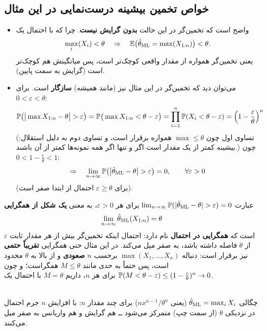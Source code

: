 \subsection{خواص تخمین بیشینه درست‌نمایی در این مثال}
\begin{itemize}
\item واضح است که تخمین‌گر  در این حالت \textbf{بدون گرایش نیست}. چرا که با احتمال یک
\[
\max_i(X_i)<\theta\quad\Rightarrow\quad\mathbb{E}\big(\hat\theta_{\mathrm{ML}}=\max(X_{1:n})\big)<\theta .
\]
یعنی تخمین‌گر همواره از مقدار واقعی کوچک‌تر است، پس میانگینش هم کوچک‌تر است (گرایش به سمت پایین).
\item می‌توان دید که تخمین‌گر  در این مثال نیز (مانند همیشه) \textbf{سازگار} است. برای $0<\varepsilon<\theta$:
\[
\Prob\big(\big|\max X_{1:n}-\theta\big|>\varepsilon\big)=\Prob\big(\max X_{1:n}<\theta-\varepsilon\big)=\prod_{i=1}^n\Prob(X_i<\theta-\varepsilon)=\Big(1-\frac\varepsilon\theta\Big)^n
\]
(تساوی اول چون $\max\le\theta$ همواره برقرار است، و تساوی دوم به دلیل استقلال: بیشینه کمتر از یک مقدار است اگر و تنها اگر همه نمونه‌ها کمتر از آن باشند.) چون $0<1-\frac\varepsilon\theta<1$:
\[
\Rightarrow\quad\lim_{n\to\infty}\Prob\big(\big|\hat\theta_\ML-\theta\big|>\varepsilon\big)=0,\qquad\forall\varepsilon>0
\]
(برای $\varepsilon\ge\theta$ احتمال از ابتدا صفر است).
\end{itemize}

\begin{note}
\notetitle عبارت $\lim_{n\to\infty}\Prob(|\hat\theta_\ML-\theta|>\varepsilon)=0$ برای هر $\varepsilon>0$، به معنی \textbf{یک شکل از همگرایی}
\[
\lim_{n\to\infty}\hat\theta_{\mathrm{ML}}(X_{1:n})=\theta
\]
است که \textbf{همگرایی در احتمال}  نام دارد: احتمال اینکه تخمین‌گر بیش از هر مقدار ثابت $\varepsilon$ از $\theta$ فاصله داشته باشد، به صفر میل می‌کند. در این مثال حتی همگرایی \textbf{تقریباً حتمی} نیز برقرار است: دنباله $\max(X_1,\ldots,X_n)$ برحسب $n$ \textbf{صعودی} و از بالا به $\theta$ محدود است، پس حتماً به حدی مانند $M\le\theta$ همگراست؛ و چون $\mathbb{P}(M<\theta-\varepsilon)\le(1-\frac\varepsilon\theta)^n\to0$ برای هر $n$، داریم $M=\theta$ با احتمال یک.
\end{note}

\begin{center}
\\
{\small چگالی $\hat\theta_{\mathrm{ML}}=\max_iX_i$ (یعنی $nx^{n-1}/\theta^n$) برای چند مقدار $n$: با افزایش $n$ جرم احتمال در نزدیکی $\theta$ (از سمت چپ) متمرکز می‌شود ــ هم گرایش و هم واریانس به صفر میل می‌کنند.}
\end{center}

